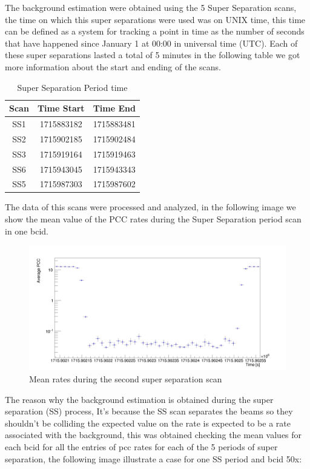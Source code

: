 The background estimation were obtained using the 5 Super Separation scans, the time on which this super separations were used was on UNIX time, this time can be defined as a system for tracking a point in time as the number of seconds that have happened since January 1 at 00:00 in universal time (UTC). Each of these super separations lasted a total of 5 minutes in the following table we got more information about the start and ending of the scans. 

\begin{table} [H]
\begin{center}
\caption{Super Separation Period time}
\begin{tabular}{|c c c|} 
 \hline
 Scan & Time Start & Time End  \\ [0.5ex] 
 \hline\hline
 SS1 & 1715883182 & 1715883481  \\ 
 \hline
 SS2 & 1715902185 & 1715902484  \\
 \hline
 SS3 & 1715919164 & 1715919463 \\
 \hline
 SS6 & 1715943045 & 1715943343  \\
 \hline
 SS5 & 1715987303 & 1715987602  \\ [1.0ex]
 \hline
\end{tabular}
\end{center}
\end{table}

The data of this scans were processed and analyzed, in the following image we show the mean value of the PCC rates during the Super Separation period scan in one bcid.

\begin{figure}[H]
    \centering
    \includegraphics[width=1\textwidth]{SS1.jpeg}
    \caption{Mean rates during the second super separation scan}
    \label{fig:SS1}
\end{figure}

The reason why the background estimation is obtained during the super separation (SS) process, It's because the SS scan separates the beams so they shouldn't be colliding the expected value on the rate is expected to be a rate associated with the background, this was obtained checking the mean values for each bcid for all the entries of pcc rates for each of the 5 periods of super separation, the following image illustrate a case for one SS period and bcid 50x:

